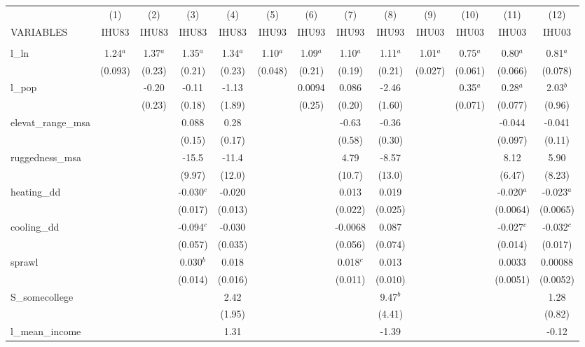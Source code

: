 \documentclass[]{article}
\begin{document}
\begin{tabular}{lcccccccccccc} \hline
 & (1) & (2) & (3) & (4) & (5) & (6) & (7) & (8) & (9) & (10) & (11) & (12) \\
VARIABLES & IHU83 & IHU83 & IHU83 & IHU83 & IHU93 & IHU93 & IHU93 & IHU93 & IHU03 & IHU03 & IHU03 & IHU03 \\ \hline
 &  &  &  &  &  &  &  &  &  &  &  &  \\
l\_ln & 1.24$^a$ & 1.37$^a$ & 1.35$^a$ & 1.34$^a$ & 1.10$^a$ & 1.09$^a$ & 1.10$^a$ & 1.11$^a$ & 1.01$^a$ & 0.75$^a$ & 0.80$^a$ & 0.81$^a$ \\
 & (0.093) & (0.23) & (0.21) & (0.23) & (0.048) & (0.21) & (0.19) & (0.21) & (0.027) & (0.061) & (0.066) & (0.078) \\
l\_pop &  & -0.20 & -0.11 & -1.13 &  & 0.0094 & 0.086 & -2.46 &  & 0.35$^a$ & 0.28$^a$ & 2.03$^b$ \\
 &  & (0.23) & (0.18) & (1.89) &  & (0.25) & (0.20) & (1.60) &  & (0.071) & (0.077) & (0.96) \\
elevat\_range\_msa &  &  & 0.088 & 0.28 &  &  & -0.63 & -0.36 &  &  & -0.044 & -0.041 \\
 &  &  & (0.15) & (0.17) &  &  & (0.58) & (0.30) &  &  & (0.097) & (0.11) \\
ruggedness\_msa &  &  & -15.5 & -11.4 &  &  & 4.79 & -8.57 &  &  & 8.12 & 5.90 \\
 &  &  & (9.97) & (12.0) &  &  & (10.7) & (13.0) &  &  & (6.47) & (8.23) \\
heating\_dd &  &  & -0.030$^c$ & -0.020 &  &  & 0.013 & 0.019 &  &  & -0.020$^a$ & -0.023$^a$ \\
 &  &  & (0.017) & (0.013) &  &  & (0.022) & (0.025) &  &  & (0.0064) & (0.0065) \\
cooling\_dd &  &  & -0.094$^c$ & -0.030 &  &  & -0.0068 & 0.087 &  &  & -0.027$^c$ & -0.032$^c$ \\
 &  &  & (0.057) & (0.035) &  &  & (0.056) & (0.074) &  &  & (0.014) & (0.017) \\
sprawl &  &  & 0.030$^b$ & 0.018 &  &  & 0.018$^c$ & 0.013 &  &  & 0.0033 & 0.00088 \\
 &  &  & (0.014) & (0.016) &  &  & (0.011) & (0.010) &  &  & (0.0051) & (0.0052) \\
S\_somecollege &  &  &  & 2.42 &  &  &  & 9.47$^b$ &  &  &  & 1.28 \\
 &  &  &  & (1.95) &  &  &  & (4.41) &  &  &  & (0.82) \\
l\_mean\_income &  &  &  & 1.31 &  &  &  & -1.39 &  &  &  & -0.12 \\

\end{tabular}
\end{document}
